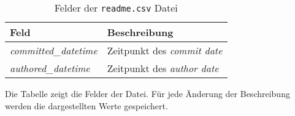 \begin{table}
    \centering
    \begin{tabularx}{\textwidth}{XL{10.2cm}}
        \toprule
        \textbf{Feld}              & \textbf{Beschreibung}            \\ \midrule
        \emph{committed\_datetime} & Zeitpunkt des \emph{commit date} \\
        \emph{authored\_datetime}  & Zeitpunkt des \emph{author date} \\
        \bottomrule
    \end{tabularx}
    \caption{Felder der \texttt{readme.csv} Datei}
    \label{tab:readme}
    \small
    \raggedright
    Die Tabelle zeigt die Felder der  Datei. Für jede Änderung der Beschreibung werden die dargestellten Werte gespeichert.
\end{table}
